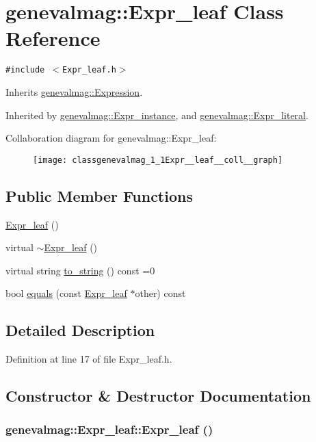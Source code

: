 \hypertarget{classgenevalmag_1_1Expr__leaf}{
\section{genevalmag::Expr\_\-leaf Class Reference}
\label{classgenevalmag_1_1Expr__leaf}
}
{\tt \#include $<$Expr\_\-leaf.h$>$}

Inherits \hyperlink{classgenevalmag_1_1Expression}{genevalmag::Expression}.

Inherited by \hyperlink{classgenevalmag_1_1Expr__instance}{genevalmag::Expr\_\-instance}, and \hyperlink{classgenevalmag_1_1Expr__literal}{genevalmag::Expr\_\-literal}.

Collaboration diagram for genevalmag::Expr\_\-leaf:\nopagebreak
\begin{figure}[H]
\begin{center}
\leavevmode
\texttt{[image: classgenevalmag\_1\_1Expr\_\_leaf\_\_coll\_\_graph]}
\end{center}
\end{figure}
\subsection*{Public Member Functions}
\begin{CompactItemize}
\item 
\hyperlink{classgenevalmag_1_1Expr__leaf_5deba73ccc015e6c1d926b9d11fbefb5}{Expr\_\-leaf} ()
\item 
virtual \hyperlink{classgenevalmag_1_1Expr__leaf_435c12ce45debdded6be221b0da68c7e}{$\sim$Expr\_\-leaf} ()
\item 
virtual string \hyperlink{classgenevalmag_1_1Expr__leaf_96854f59a155b173b6e79007d87bdad5}{to\_\-string} () const =0
\item 
bool \hyperlink{classgenevalmag_1_1Expr__leaf_115a2d203c018eab86e8973b610f7d28}{equals} (const \hyperlink{classgenevalmag_1_1Expr__leaf}{Expr\_\-leaf} $\ast$other) const 
\end{CompactItemize}


\subsection{Detailed Description}


Definition at line 17 of file Expr\_\-leaf.h.

\subsection{Constructor \& Destructor Documentation}
\hypertarget{classgenevalmag_1_1Expr__leaf_5deba73ccc015e6c1d926b9d11fbefb5}{
\subsubsection[{Expr\_\-leaf}]{\setlength{\rightskip}{0pt plus 5cm}genevalmag::Expr\_\-leaf::Expr\_\-leaf ()}}
\label{classgenevalmag_1_1Expr__leaf_5deba73ccc015e6c1d926b9d11fbefb5}


